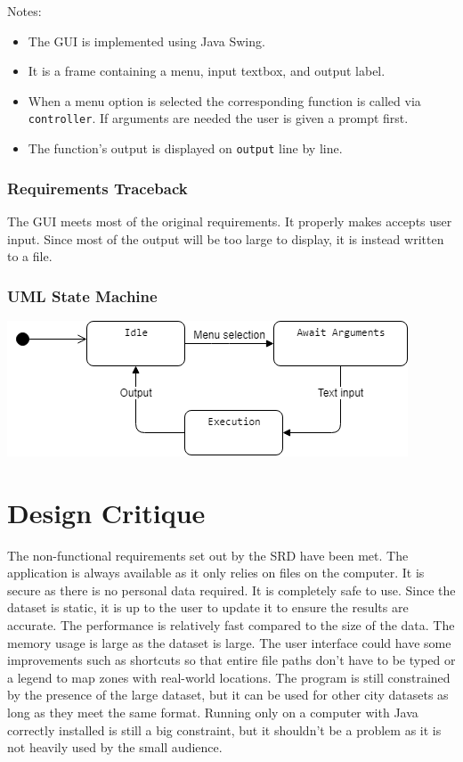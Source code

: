 \documentclass[12pt]{article}
\newcommand{\bi}{\begin{itemize}}
\newcommand{\ei}{\end{itemize}}
\newcommand{\code}[1]{\texttt{#1}}
\begin{document}
\noindent Notes:

\bi
    \item The GUI is implemented using Java Swing.
    \item It is a frame containing a menu, input textbox, and output label.
    \item When a menu option is selected the corresponding function is called via \code{controller}. If arguments are needed the user is given a prompt first.
    \item The function's output is displayed on \code{output} line by line.
\ei

\subsubsection{Requirements Traceback}

The GUI meets most of the original requirements. It properly makes accepts user input. Since most of the output will be too large to display, it is instead written to a file.

\subsubsection{UML State Machine}

\includegraphics[scale = 0.80]{Images/GUIDiagram.png}

\newpage

\section{Design Critique}

The non-functional requirements set out by the SRD have been met. The application is always available as it only relies on files on the computer. It is secure as there is no personal data required. It is completely safe to use. Since the dataset is static, it is up to the user to update it to ensure the results are accurate. The performance is relatively fast compared to the size of the data. The memory usage is large as the dataset is large. The user interface could have some improvements such as shortcuts so that entire file paths don't have to be typed or a legend to map zones with real-world locations. The program is still constrained by the presence of the large dataset, but it can be used for other city datasets as long as they meet the same format. Running only on a computer with Java correctly installed is still a big constraint, but it shouldn't be a problem as it is not heavily used by the small audience.
\end{document}

